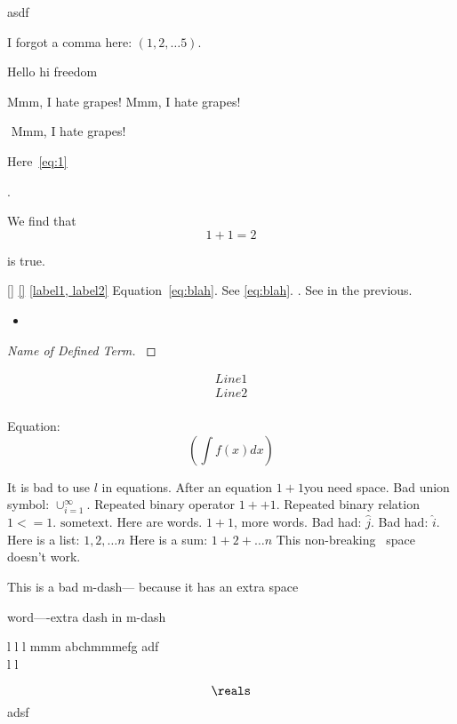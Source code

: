 asdf

I forgot a comma here: $(1, 2, \dots 5)$.

\cite{} 

Hello hi freedom

Mmm, I hate grapes! 
Mmm, I hate grapes! 

$$ $$ $$ $$
$ $
Mmm, I hate grapes! 


Here~\cref{eq:1}

\[
    
\].

We find that
\[
    1 + 1 = 2
\] 

is true.
 
\ref{} 
\cref{}
\cite{}
\label{\alpha}
\label{a,b} 
\cref{label1, label2}
Equation~\ref{eq:blah}.
See \cref{eq:blah}.
\cite[Theorem 1]{a}. 
See in the previous.


\begin{itemize}
    a
    \item  
\end{itemize}

\begin{proof}[Name of Defined Term]
    \label{def:Name of Defined Term}
    

\end{proof}
\begin{align}
    Line 1 \\
    Line 2 \\
\end{align}

Equation:
\[
    (\int f(x) dx)
\] 


It is bad to use $l$ in equations.
After an equation $1+1$you need space.
Bad union symbol: $\cup_{i=1}^\infty$.
Repeated binary operator $1 ++ 1$.
Repeated binary relation $1 <= 1$.
$\mathrm{some text}$.
Here are words. $1 + 1$, more words.
Bad had: $\hat{j}$.
Bad had: $\hat i$.
Here is a list: $1, 2, \dots n$
Here is a sum: $1 + 2 + \dots n$
This non-breaking~ space doesn't work.

This is a bad m-dash---
because it has an extra space

word----extra dash in m-dash
  
 \hat{\jmath} l  l l    mmm abchmmmefg adf
 $$ $$  
 l  l

 
  \[{\reals}\]  
adsf  
    
 
